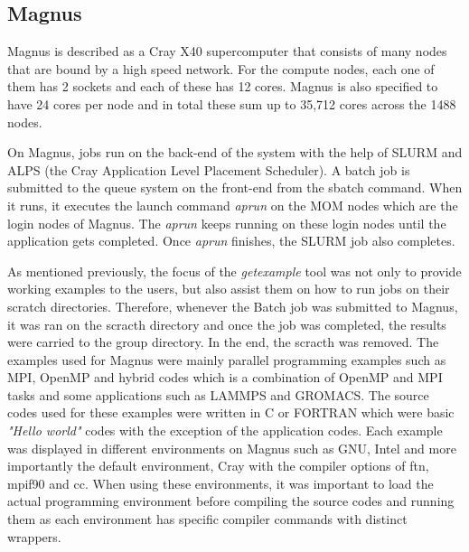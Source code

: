 \subsection{Magnus}

Magnus is described as a Cray X40 supercomputer that consists of many nodes that are bound by a high speed network. For the compute nodes, each one 
of them has 2 sockets and each of these has 12 cores. Magnus is also specified to have 24 cores per node and in total these sum up to 35,712 cores across 
the 1488 nodes. 

On Magnus, jobs run on the back-end of the system with the help of SLURM and ALPS (the Cray Application Level Placement Scheduler). A batch job is 
submitted to the queue system on the front-end from the sbatch command. When it runs, it executes the launch command \emph{aprun} on the MOM nodes 
which are the login nodes of Magnus. The \emph{aprun} keeps running on these login nodes until the application gets completed. Once \emph{aprun} finishes, the 
SLURM job also completes.

As mentioned previously, the focus of the \emph{getexample} tool was not only to provide working examples to the users, but also assist them on how to run jobs
on their scratch directories. Therefore, whenever the Batch job was submitted to Magnus, it was ran on the scracth directory and once the job was 
completed, the results were carried to the group directory. In the end, the scracth was removed. The examples used for Magnus were mainly parallel
programming examples such as MPI, OpenMP and hybrid codes which is a combination of OpenMP and MPI tasks and some applications such as LAMMPS and GROMACS.
The source codes used for these examples were written in C or FORTRAN which were basic \emph{"Hello world"} codes with the exception of the application codes.
Each example was displayed in different environments on Magnus such as GNU, Intel and more importantly the default environment, Cray with the compiler
options of ftn, mpif90 and cc. When using these environments, it was important to load the actual programming environment before compiling the source
codes and running them as each environment has specific compiler commands with distinct wrappers.
